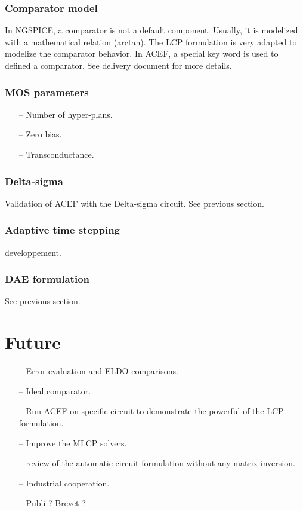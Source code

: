 \subsubsection{Comparator model}
In NGSPICE, a comparator is not a default component. Usually, it is modelized with a mathematical
relation (arctan). The LCP formulation is very adapted to modelize the comparator behavior. In ACEF,
a special key word is used to defined a comparator.
See delivery document for more details.

\subsubsection{MOS parameters}

 \begin{itemize}
  \item[--] Number of hyper-plans. 
  \item[--] Zero bias.
  \item[--] Transconductance.
\end{itemize}

\subsubsection{Delta-sigma}
Validation of ACEF with the Delta-sigma circuit. See previous section.

\subsubsection{Adaptive time stepping}
developpement.

\subsubsection{DAE formulation}
See previous section.

\section{Future}
 \begin{itemize}
  \item[--] Error evaluation and ELDO comparisons. 
  \item[--] Ideal comparator. 
  \item[--] Run ACEF on specific circuit to demonstrate the powerful of the LCP formulation.
  \item[--] Improve the MLCP solvers.
  \item[--] review of the automatic circuit formulation without any matrix inversion.
  \item[--] Industrial cooperation.
  \item[--] Publi ? Brevet ?
  
\end{itemize}

